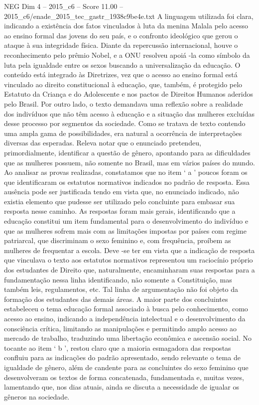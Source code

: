 \begin{textsample}{NEG Dim 4 – 2015\_c6 – Score 11.00 – 2015\_c6/enade\_2015\_tec\_gastr\_1938c9be4e.txt}
A linguagem utilizada foi clara, indicando a existência dos fatos vinculados à luta da menina Malala pelo acesso ao ensino formal das jovens do seu país, e o confronto ideológico que gerou o ataque à sua integridade física.
Diante da repercussão internacional, houve o reconhecimento pelo prêmio Nobel, e a ONU resolveu apoiá -la como símbolo da luta pela igualdade entre os sexos buscando a universalização da educação.
O conteúdo está integrado às Diretrizes, vez que o acesso ao ensino formal está vinculado ao direito constitucional à educação, que, também, é protegido pelo Estatuto da Criança e do Adolescente e nos pactos de Direitos Humanos aderidos pelo Brasil.
Por outro lado, o texto demandava uma reflexão sobre a realidade dos indivíduos que não têm acesso à educação e a situação das mulheres excluídas desse processo por segmentos da sociedade.
Como se tratava de texto contendo uma ampla gama de possibilidades, era natural a ocorrência de interpretações diversas das esperadas.
Releva notar que o enunciado pretendeu, primordialmente, identificar a questão de gênero, apontando para as dificuldades que as mulheres possuem, não somente no Brasil, mas em vários países do mundo.
Ao analisar as provas realizadas, constatamos que no item ‘ a ’ poucos foram os que identificaram os estatutos normativos indicados no padrão de resposta.
Essa ausência pode ser justificada tendo em vista que, no enunciado indicado, não existia elemento que pudesse ser utilizado pelo concluinte para embasar sua resposta nesse caminho.
As respostas foram mais gerais, identificando que a educação constitui um item fundamental para o desenvolvimento do indivíduo e que as mulheres sofrem mais com as limitações impostas por países com regime patriarcal, que discriminam o sexo feminino e, com frequência, proíbem as mulheres de frequentar a escola.
Deve -se ter em vista que a indicação de resposta que vinculava o texto aos estatutos normativos representou um raciocínio próprio dos estudantes de Direito que, naturalmente, encaminharam suas respostas para a fundamentação nessa linha identificando, não somente a Constituição, mas também leis, regulamentos, etc.
Tal linha de argumentação não foi objeto da formação dos estudantes das demais áreas.
A maior parte dos concluintes estabeleceu o tema educação formal associado à busca pelo conhecimento, como acesso ao ensino, indicando a independência intelectual e o desenvolvimento da consciência crítica, limitando as manipulações e permitindo amplo acesso ao mercado de trabalho, traduzindo uma libertação econômica e ascensão social.
No tocante ao item ‘ b ’, restou claro que a maioria esmagadora das respostas confluiu para as indicações do padrão apresentado, sendo relevante o tema de igualdade de gênero, além de candente para as concluintes do sexo feminino que desenvolveram os textos de forma concatenada, fundamentada e, muitas vezes, lamentando que, nos dias atuais, ainda se discuta a necessidade de igualar os gêneros na sociedade.

\end{textsample}
